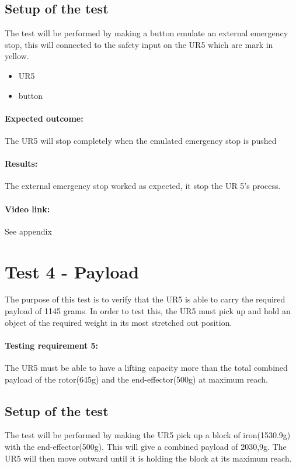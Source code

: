 \subsection{Setup of the test}
The test will be performed by making a button emulate an external emergency stop, this will connected to the safety input on the UR5 which are mark in yellow.

 \begin{itemize}
     \item UR5
     \item button
 \end{itemize}
 
 \paragraph{Expected outcome:}
The UR5 will stop completely when the emulated emergency stop is pushed

 
\paragraph{Results: }

The external emergency stop worked as expected, it stop the UR 5's process.

\paragraph{Video link: }
See appendix \cite{testfilm}


\section{Test 4 - Payload}
The purpose of this test is to verify that the UR5 is able to carry the required payload of 1145 grams. In order to test this, the UR5 must pick up and hold an object of the required weight in its most stretched out position.

\paragraph{Testing requirement 5:} The UR5 must be able to have a lifting capacity more than the total combined payload of the rotor(645g) and the end-effector(500g) at maximum reach.\\

\subsection{Setup of the test}
The test will be performed by making the UR5 pick up a block of iron(1530.9g) with the end-effector(500g). This will give a combined payload of 2030,9g. The UR5 will then move outward until it is holding the block at its maximum reach. 

